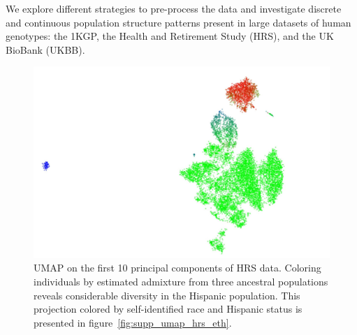 \documentclass[12pt]{pnas-new}
\begin{document}
We explore different strategies to pre-process the data and investigate discrete and continuous population structure patterns present in large datasets of human genotypes: the 1KGP, the Health and Retirement Study (HRS)\cite{juster1995overview}, and the UK BioBank (UKBB)\cite{sudlow2015uk}.  

\begin{figure}
\centering
   \includegraphics[width=0.6\linewidth]{images/HRS_1000G_NP1_UMAP_PC10_NC2_NN15_MD05_pca_1kgp_onto_hrs_umap_1kgp_onto_hrs_2018112221116_admix.pdf}
   \caption{UMAP on the first 10 principal components of HRS data. Coloring individuals by estimated admixture from three ancestral populations reveals considerable diversity in the Hispanic population. This projection colored by self-identified race and Hispanic status is presented in figure~\ref{fig:supp_umap_hrs_eth}.}
    \label{fig:umap_hrs_admix}
\end{figure}

\end{document}
